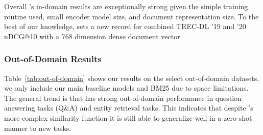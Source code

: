 \documentclass[sigconf,]{acmart}
\begin{document}
Overall \name{}'s in-domain results are exceptionally strong given the simple training routine used, small encoder model size, and document representation size. To the best of our knowledge, \name{} sets a new record for combined TREC-DL '19 and '20 nDCG@10 with a 768 dimension dense document vector.

\subsubsection{Out-of-Domain Results}
Table~\ref{tab:out-of-domain} shows our results on the select out-of-domain datasets, we only include our main baseline models and BM25 due to space limitations. The general trend is that \name{} has strong out-of-domain performance in question answering tasks (Q\&A) and entity retrieval tasks. This indicates that despite \name{}'s more complex similarity function it is still able to generalize well in a zero-shot manner to new tasks.

\begin{table}
    \centering
    \caption{Out-of-domain results in nDCG@10. We only compare significance with BE-Base. Significance results with $p < 0.05$ are shown with the $\BeBaseSymbol$ and $p < 0.1$ are shown with $\diamondsuit$.} \label{tab:out-of-domain}
\vspace{-8pt}
\end{table}
\end{document}
